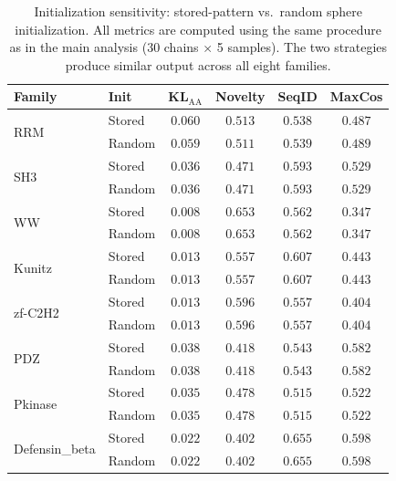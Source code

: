 \begin{table}[ht]
\centering
\caption{Initialization sensitivity: stored-pattern vs.\ random sphere initialization. All metrics are computed using the same procedure as in the main analysis (30 chains $\times$ 5 samples). The two strategies produce similar output across all eight families.}
\label{tab:random-init}
\small
\begin{tabular}{@{}llcccc@{}}
\toprule
Family & Init & KL$_{\mathrm{AA}}$ & Novelty & SeqID & MaxCos \\
\midrule
\multirow{2}{*}{RRM}
 & Stored & $0.060$ & $0.513$ & $0.538$ & $0.487$ \\
 & Random & $0.059$ & $0.511$ & $0.539$ & $0.489$ \\
\midrule
\multirow{2}{*}{SH3}
 & Stored & $0.036$ & $0.471$ & $0.593$ & $0.529$ \\
 & Random & $0.036$ & $0.471$ & $0.593$ & $0.529$ \\
\midrule
\multirow{2}{*}{WW}
 & Stored & $0.008$ & $0.653$ & $0.562$ & $0.347$ \\
 & Random & $0.008$ & $0.653$ & $0.562$ & $0.347$ \\
\midrule
\multirow{2}{*}{Kunitz}
 & Stored & $0.013$ & $0.557$ & $0.607$ & $0.443$ \\
 & Random & $0.013$ & $0.557$ & $0.607$ & $0.443$ \\
\midrule
\multirow{2}{*}{zf-C2H2}
 & Stored & $0.013$ & $0.596$ & $0.557$ & $0.404$ \\
 & Random & $0.013$ & $0.596$ & $0.557$ & $0.404$ \\
\midrule
\multirow{2}{*}{PDZ}
 & Stored & $0.038$ & $0.418$ & $0.543$ & $0.582$ \\
 & Random & $0.038$ & $0.418$ & $0.543$ & $0.582$ \\
\midrule
\multirow{2}{*}{Pkinase}
 & Stored & $0.035$ & $0.478$ & $0.515$ & $0.522$ \\
 & Random & $0.035$ & $0.478$ & $0.515$ & $0.522$ \\
\midrule
\multirow{2}{*}{Defensin\_beta}
 & Stored & $0.022$ & $0.402$ & $0.655$ & $0.598$ \\
 & Random & $0.022$ & $0.402$ & $0.655$ & $0.598$ \\
\bottomrule
\end{tabular}
\end{table}

